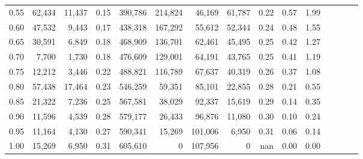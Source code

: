 \begin{tabular}{rrrcrrrrrrrrrrr}
0.55 &  62,434 &  11,437 &                                       0.15 &  390,786 &  214,824 &   46,169 &   61,787 &  0.22 &  0.57 &                         1.99 \\
0.60 &  47,532 &   9,443 &                                       0.17 &  438,318 &  167,292 &   55,612 &   52,344 &  0.24 &  0.48 &                         1.55 \\
0.65 &  30,591 &   6,849 &                                       0.18 &  468,909 &  136,701 &   62,461 &   45,495 &  0.25 &  0.42 &                         1.27 \\
0.70 &   7,700 &   1,730 &                                       0.18 &  476,609 &  129,001 &   64,191 &   43,765 &  0.25 &  0.41 &                         1.19 \\
0.75 &  12,212 &   3,446 &                                       0.22 &  488,821 &  116,789 &   67,637 &   40,319 &  0.26 &  0.37 &                         1.08 \\
0.80 &  57,438 &  17,464 &                                       0.23 &  546,259 &   59,351 &   85,101 &   22,855 &  0.28 &  0.21 &                         0.55 \\
0.85 &  21,322 &   7,236 &                                       0.25 &  567,581 &   38,029 &   92,337 &   15,619 &  0.29 &  0.14 &                         0.35 \\
0.90 &  11,596 &   4,539 &                                       0.28 &  579,177 &   26,433 &   96,876 &   11,080 &  0.30 &  0.10 &                         0.24 \\
0.95 &  11,164 &   4,130 &                                       0.27 &  590,341 &   15,269 &  101,006 &    6,950 &  0.31 &  0.06 &                         0.14 \\
1.00 &  15,269 &   6,950 &                                       0.31 &  605,610 &        0 &  107,956 &        0 &   nan &  0.00 &                         0.00 \\
\bottomrule
\end{tabular}
